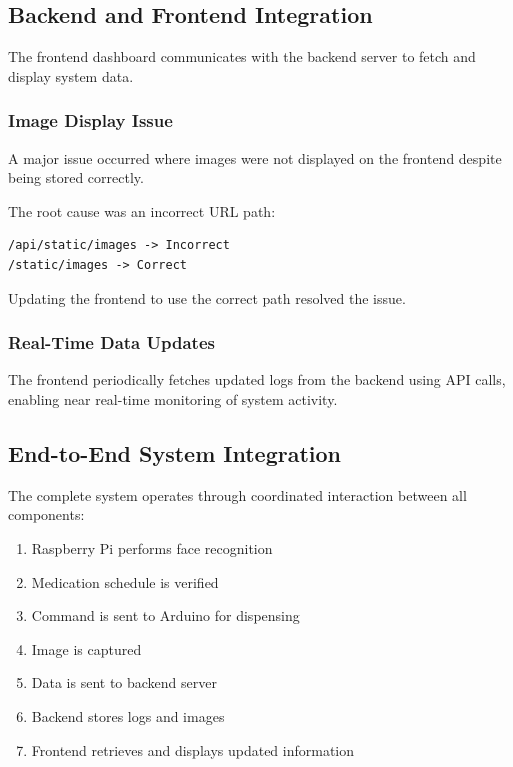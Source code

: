 \subsection{Backend and Frontend Integration}

The frontend dashboard communicates with the backend server to fetch and display system data.

\subsubsection{Image Display Issue}

A major issue occurred where images were not displayed on the frontend despite being stored correctly.

The root cause was an incorrect URL path:

\begin{verbatim}
/api/static/images -> Incorrect
/static/images -> Correct
\end{verbatim}

Updating the frontend to use the correct path resolved the issue.

\subsubsection{Real-Time Data Updates}

The frontend periodically fetches updated logs from the backend using API calls, enabling near real-time monitoring of system activity.

\subsection{End-to-End System Integration}

The complete system operates through coordinated interaction between all components:

\begin{enumerate}
    \item Raspberry Pi performs face recognition
    \item Medication schedule is verified
    \item Command is sent to Arduino for dispensing
    \item Image is captured
    \item Data is sent to backend server
    \item Backend stores logs and images
    \item Frontend retrieves and displays updated information
\end{enumerate}

